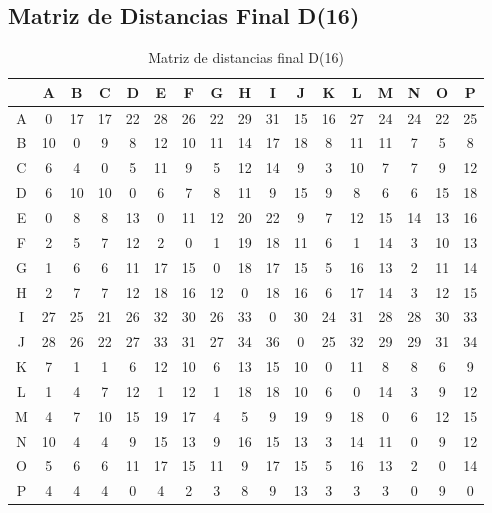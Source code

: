 \documentclass[12pt]{article}
\begin{document}
\subsection{Matriz de Distancias Final D(16)}
\begin{table}[h!]
\centering
\begin{tabular}{|c|c|c|c|c|c|c|c|c|c|c|c|c|c|c|c|c|}
\hline
 & A & B & C & D & E & F & G & H & I & J & K & L & M & N & O & P \\\hline
A & 0 & 17 & 17 & 22 & 28 & 26 & 22 & 29 & 31 & 15 & 16 & 27 & 24 & 24 & 22 & 25 \\\hline
B & 10 & 0 & 9 & 8 & 12 & 10 & 11 & 14 & 17 & 18 & 8 & 11 & 11 & 7 & 5 & 8 \\\hline
C & 6 & 4 & 0 & 5 & 11 & 9 & 5 & 12 & 14 & 9 & 3 & 10 & 7 & 7 & 9 & 12 \\\hline
D & 6 & 10 & 10 & 0 & 6 & 7 & 8 & 11 & 9 & 15 & 9 & 8 & 6 & 6 & 15 & 18 \\\hline
E & 0 & 8 & 8 & 13 & 0 & 11 & 12 & 20 & 22 & 9 & 7 & 12 & 15 & 14 & 13 & 16 \\\hline
F & 2 & 5 & 7 & 12 & 2 & 0 & 1 & 19 & 18 & 11 & 6 & 1 & 14 & 3 & 10 & 13 \\\hline
G & 1 & 6 & 6 & 11 & 17 & 15 & 0 & 18 & 17 & 15 & 5 & 16 & 13 & 2 & 11 & 14 \\\hline
H & 2 & 7 & 7 & 12 & 18 & 16 & 12 & 0 & 18 & 16 & 6 & 17 & 14 & 3 & 12 & 15 \\\hline
I & 27 & 25 & 21 & 26 & 32 & 30 & 26 & 33 & 0 & 30 & 24 & 31 & 28 & 28 & 30 & 33 \\\hline
J & 28 & 26 & 22 & 27 & 33 & 31 & 27 & 34 & 36 & 0 & 25 & 32 & 29 & 29 & 31 & 34 \\\hline
K & 7 & 1 & 1 & 6 & 12 & 10 & 6 & 13 & 15 & 10 & 0 & 11 & 8 & 8 & 6 & 9 \\\hline
L & 1 & 4 & 7 & 12 & 1 & 12 & 1 & 18 & 18 & 10 & 6 & 0 & 14 & 3 & 9 & 12 \\\hline
M & 4 & 7 & 10 & 15 & 19 & 17 & 4 & 5 & 9 & 19 & 9 & 18 & 0 & 6 & 12 & 15 \\\hline
N & 10 & 4 & 4 & 9 & 15 & 13 & 9 & 16 & 15 & 13 & 3 & 14 & 11 & 0 & 9 & 12 \\\hline
O & 5 & 6 & 6 & 11 & 17 & 15 & 11 & 9 & 17 & 15 & 5 & 16 & 13 & 2 & 0 & 14 \\\hline
P & 4 & 4 & 4 & 0 & 4 & 2 & 3 & 8 & 9 & 13 & 3 & 3 & 3 & 0 & 9 & 0 \\\hline
\end{tabular}
\caption{Matriz de distancias final D(16)}
\end{table}
\end{document}
